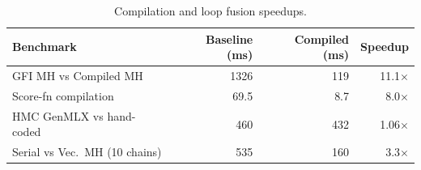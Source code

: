 \begin{table}[t]
\centering
\caption{Compilation and loop fusion speedups.}
\label{tab:compilation}
\begin{tabular}{l r r r}
\toprule
Benchmark & Baseline (ms) & Compiled (ms) & Speedup \\
\midrule
GFI MH vs Compiled MH & 1326 & 119 & 11.1$\times$ \\
Score-fn compilation & 69.5 & 8.7 & 8.0$\times$ \\
HMC GenMLX vs hand-coded & 460 & 432 & 1.06$\times$ \\
Serial vs Vec.\ MH (10 chains) & 535 & 160 & 3.3$\times$ \\
\bottomrule
\end{tabular}
\end{table}
